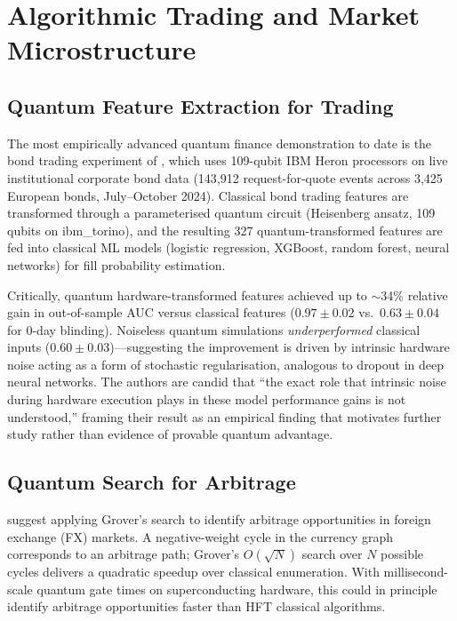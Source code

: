 \documentclass[12pt,a4paper]{article}
\begin{document}
\section{Algorithmic Trading and Market Microstructure}
\label{sec:trading}

\subsection{Quantum Feature Extraction for Trading}

The most empirically advanced quantum finance demonstration to date is the bond trading experiment of \citet{ciceri_enhanced_2025}, which uses 109-qubit IBM Heron processors on live institutional corporate bond data (143{,}912 request-for-quote events across 3{,}425 European bonds, July--October 2024). Classical bond trading features are transformed through a parameterised quantum circuit (Heisenberg ansatz, 109 qubits on ibm\_torino), and the resulting 327 quantum-transformed features are fed into classical ML models (logistic regression, XGBoost, random forest, neural networks) for fill probability estimation.

Critically, quantum hardware-transformed features achieved up to $\sim$34\% relative gain in out-of-sample AUC versus classical features ($0.97 \pm 0.02$ vs.\ $0.63 \pm 0.04$ for 0-day blinding). Noiseless quantum simulations \emph{underperformed} classical inputs ($0.60 \pm 0.03$)---suggesting the improvement is driven by intrinsic hardware noise acting as a form of stochastic regularisation, analogous to dropout in deep neural networks. The authors are candid that ``the exact role that intrinsic noise during hardware execution plays in these model performance gains is not understood,'' framing their result as an empirical finding that motivates further study rather than evidence of provable quantum advantage.

\subsection{Quantum Search for Arbitrage}

\citet{orus_quantum_2019} suggest applying Grover's search to identify arbitrage opportunities in foreign exchange (FX) markets. A negative-weight cycle in the currency graph corresponds to an arbitrage path; Grover's $O(\sqrt{N})$ search over $N$ possible cycles delivers a quadratic speedup over classical enumeration. With millisecond-scale quantum gate times on superconducting hardware, this could in principle identify arbitrage opportunities faster than HFT classical algorithms.
\end{document}
